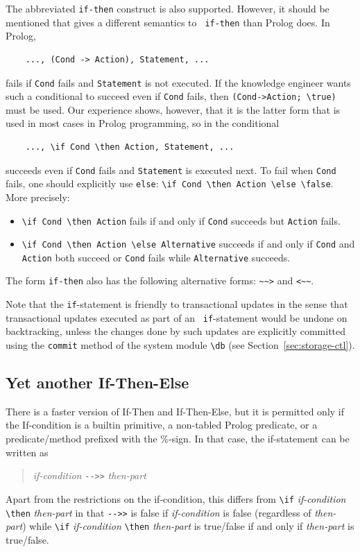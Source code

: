 \documentclass[11pt]{article}
\newcommand{\ERGO}{\mbox{\smaller{\ensuremath{\cal{E}}\smaller{{\sc{RGO}}}}}\xspace}
\newcommand{\FLSYSTEM}{\ERGO}
\newcommand{\rnafarr}{\texttt{\textasciitilde\textasciitilde>}}
\newcommand{\lnafarr}{\texttt{<\textasciitilde\textasciitilde}}
\newcommand{\bs}{\textbackslash}
\begin{document}
The abbreviated {\tt if-then} construct is also supported.  However, it
should be mentioned that \FLSYSTEM gives a different semantics to {\tt
  if-then} than Prolog does. In Prolog,
\begin{verbatim}
    ..., (Cond -> Action), Statement, ...  
\end{verbatim}
fails if {\tt Cond} fails and {\tt Statement} is not executed. If the
knowledge engineer
wants such a conditional to succeed even if {\tt Cond} fails, then
{\tt (Cond->Action; \bs{}true)} must be used. Our experience shows, however,
that it is the latter form that is used in most cases in Prolog
programming, so in \FLSYSTEM the conditional
\begin{verbatim}
    ..., \if Cond \then Action, Statement, ...  
\end{verbatim}
succeeds even if {\tt Cond} fails and {\tt Statement} is executed next. To
fail when {\tt Cond} fails, one should explicitly use {\tt else}:
{\tt \bs{}if Cond \bs{}then Action \bs{}else \bs{}false}. More precisely:
\begin{itemize}
  \item  {\tt \bs{}if Cond \bs{}then Action} fails if and only if {\tt Cond} succeeds
    but {\tt Action} fails.
  \item {\tt \bs{}if Cond \bs{}then Action \bs{}else Alternative} succeeds if and only if 
    {\tt Cond} and {\tt Action} both succeed or {\tt Cond} fails while
    {\tt Alternative} succeeds.
\end{itemize}
\index{\rnafarr}
\index{\lnafarr}
The form {\tt if-then} also has the following alternative forms: \rnafarr
and \lnafarr.

Note that the {\tt if}-statement is friendly to transactional updates in
the sense that transactional updates executed as part of an {\tt
  if}-statement would be undone on backtracking, unless the changes done by
such updates are explicitly committed using the {\tt commit} method of the
system module {\tt \bs{}db} (see Section~\ref{sec:storage-ctl}).

\subsection{Yet another If-Then-Else}

There is a faster version of If-Then and If-Then-Else, but it is permitted
only if the If-condition is a builtin primitive, a non-tabled Prolog predicate,
or a predicate/method prefixed with the \%-sign. In that case, the
if-statement can be written as
\begin{quote}
    \emph{if-condition} \texttt{-{}->{}>} \emph{then-part}    
\end{quote}
Apart from the restrictions on the if-condition, this differs from
\texttt{\bs{}if}  \emph{if-condition} \texttt{\bs{}then}  \emph{then-part} in that
\texttt{-{}->{}>} is false if \emph{if-condition} is false (regardless of
\emph{then-part}) while  \texttt{\bs{}if}  \emph{if-condition}
\texttt{\bs{}then} 
\emph{then-part} is true/false if and only if \emph{then-part} is true/false.
\end{document}
